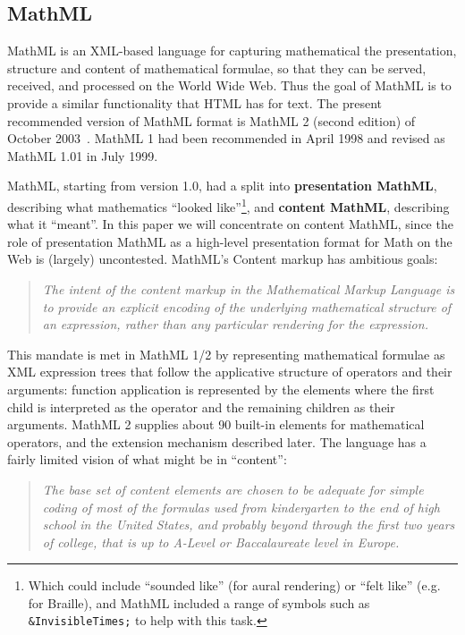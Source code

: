 \documentclass{llncs}
\begin{document}
\subsection{MathML}\label{sec:mathML}

MathML is an XML-based language for capturing mathematical the presentation, structure and
content of mathematical formulae, so that they can be served, received, and processed on
the World Wide Web. Thus the goal of MathML is to provide a similar functionality that
HTML has for text. The present recommended version of MathML format is MathML 2 (second
edition) of October 2003~\cite{WorldWideWebConsortium2003b}. MathML 1 had been recommended
in April 1998 and revised as MathML 1.01 in July 1999.

MathML, starting from version 1.0, had a split into {\textbf{presentation MathML}},
describing what mathematics ``looked like''\footnote{Which could include ``sounded like''
  (for aural rendering) or ``felt like'' (e.g. for Braille), and MathML included a range
  of symbols such as {\texttt{\&InvisibleTimes;}} to help with this task.}, and
{\textbf{content MathML}}, describing what it ``meant''. In this paper we will concentrate
on content MathML, since the role of presentation MathML as a high-level presentation
format for Math on the Web is (largely) uncontested. MathML's Content markup has ambitious
goals:
\begin{quotation}\noindent\em
  The intent of the content markup in the Mathematical Markup Language is to provide an
  explicit encoding of the {\emph{underlying mathematical structure}} of an expression,
  rather than any particular rendering for the expression.  \hfill{\hbox{\rm\cite[section
      4.1.1]{WorldWideWebConsortium2003b}}}
\end{quotation}
This mandate is met in MathML 1/2 by representing mathematical formulae as XML expression
trees that follow the applicative structure of operators and their arguments: function
application is represented by the {} elements where the first child is
interpreted as the operator and the remaining children as their arguments. MathML 2
supplies about 90 built-in elements for mathematical operators, and the
{} extension mechanism described later. The language has a fairly limited
vision of what might be in ``content'':
\begin{quotation}\noindent\em
  The base set of content elements are chosen to be adequate for simple coding of most of
  the formulas used from kindergarten to the end of high school in the United States, and
  probably beyond through the first two years of college, that is up to A-Level or
  Baccalaureate level in Europe.\hfill{\hbox{\cite[4.1.2]{WorldWideWebConsortium2003b}}}
\end{quotation}
\end{document}
